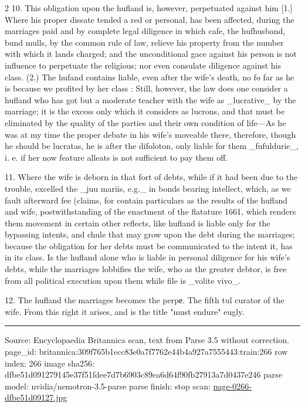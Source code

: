 \documentclass[10pt]{article}
\begin{document}
\begin{multicols}{2}
10. This obligation upon the hufland is, however, perpetuated against him [1.] Where his proper dissate tended a red or personal, has been affected, during the marriages paid and by complete legal diligence in which cafe, the hufhusband, bund mulls, by the common rule of law, relieve his property from the number with which it lands charged; and the unconditional gace against his person is not influence to perpetuate the religious; nor even consulate diligence against his class. (2.) The hufand contains liable, even after the wife’s death, no fo far as he is because we profited by her class : Still, however, the law does one consider a hufland who has got but a moderate teacher with the wife as \_lucrative\_ by the marriage; it is the excess only which it considers as lucrons, and that must be eliminated by the quality of the parties and their own condition of life—As he was at my time the proper debate in his wife’s moveable there, therefore, though he should be lucratas, he is after the difoloton, only liable for them \_fufuldurie\_, i. e. if her now feature alleats is not sufficient to pay them off.

11. Where the wife is deborn in that fort of debts, while if it had been due to the trouble, excelled the \_juu mariis, e.g.\_ in bonds bearing intellect, which, as we fault afterward fee (claims, for contain particulars as the results of the hufland and wife, postwithstanding of the enactment of the flatature 1661, which renders them movement in certain other reflects, like hufland is liable only for the bypassing intents, and chule that may grow upon the debt during the marriages; because the obligation for her debts must be communicated to the intent it, has in its class. Is the hufland alone who is liable in personal diligence for his wife’s debts, while the marriages lobbifies the wife, who as the greater debtor, is free from all political execution upon them while file is \_volite vivo\_.

12. The hufland the marriages becomes the perpе. The fifth tul curator of the wife. From this right it arises, and is the title "must endure" eugly.

\end{multicols}
\vfill\par\noindent\rule{\linewidth}{0.4pt}\par
{\scriptsize\color{gray}\noindent Source: Encyclopaedia Britannica scan, text from Parse 3.5 without correction. page\_id: britannica:309f765b1ecc83e0a7f7762e44b4a927a7555443:train:266 \quad row index: 266 \quad image sha256: dfbe51d091279145e37f51fdee7d7b6903c89ea6d64f90fb27913a7d0437e246 \quad parse model: nvidia/nemotron-3.5-parse \quad parse finish: stop \quad scan: \href{../scans/page-0266-dfbe51d09127.jpg}{page-0266-dfbe51d09127.jpg}\par}
\end{document}
